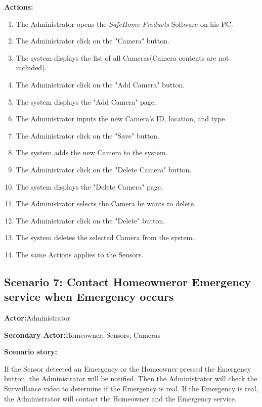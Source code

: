 \documentclass[twoside,11pt]{article}
\begin{document}
\textbf{Actions:}
\begin{enumerate}
    \item The Administrator opens the \emph{SafeHome Products} Software on his PC.
    \item The Administrator click on the "Camera" button.
    \item The system displays the list of all Cameras(Camera contents are not included).
    \item The Administrator click on the "Add Camera" button.
    \item The system displays the "Add Camera" page.
    \item The Administrator inputs the new Camera's ID, location, and type.
    \item The Administrator click on the "Save" button.
    \item The system adds the new Camera to the system.
    \item The Administrator click on the "Delete Camera" button.
    \item The system displays the "Delete Camera" page.
    \item The Administrator selects the Camera he wants to delete.
    \item The Administrator click on the "Delete" button.
    \item The system deletes the selected Camera from the system.
    \item The same Actions applies to the Sensors.
\end{enumerate}



\subsection{Scenario 7: Contact Homeowneror Emergency service when Emergency occurs}

\textbf{Actor:}Administrator

\textbf{Secondary Actor:}Homeowner, Sensors, Cameras

\textbf{Scenario story:}

If the Sensor detected an Emergency or the Homeowner pressed the Emergency button, the Administrator will be notified. Then the Administrator will check the Surveillance video to determine if the Emergency is real. If the Emergency is real, the Administrator will contact the Homeowner and the Emergency service.
\end{document}
